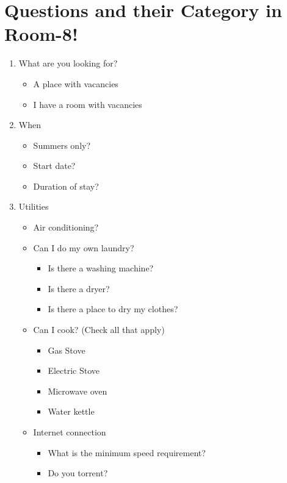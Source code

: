 \documentclass[journal]{./IEEE/IEEEtran}
\begin{document}
\section{Questions and their Category in Room-8!}
\begin{enumerate}

    \item What are you looking for?
    \begin{itemize}
        \item A place with vacancies
        \item I have a room with vacancies
    \end{itemize}

    \item When
    \begin{itemize}
        \item Summers only?
        \item Start date?
        \item Duration of stay?
    \end{itemize}

    \item Utilities
    \begin{itemize}
        \item Air conditioning?
        \item Can I do my own laundry?
        \begin{itemize}
            \item Is there a washing machine?
            \item Is there a dryer?
            \item Is there a place to dry my clothes?
        \end{itemize}
        \item Can I cook? (Check all that apply)
        \begin{itemize}
            \item Gas Stove
            \item Electric Stove
            \item Microwave oven
            \item Water kettle
        \end{itemize}
        \item Internet connection
        \begin{itemize}
            \item What is the minimum speed requirement?
            \item Do you torrent?
        \end{itemize}
    \end{itemize}


\end{enumerate}
\end{document}
